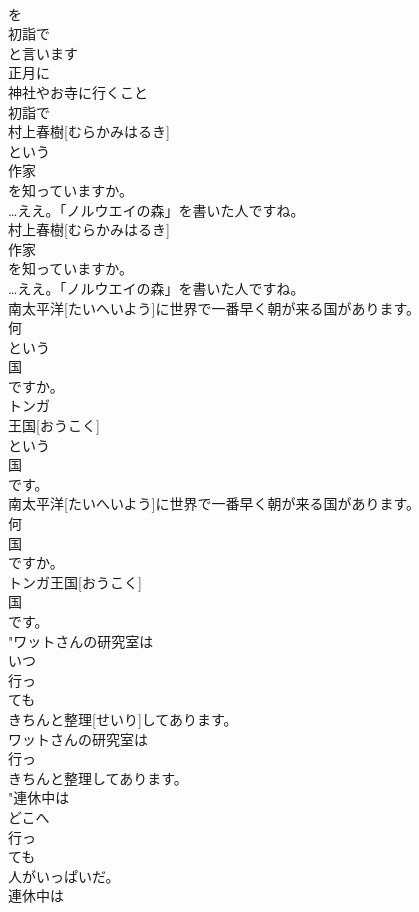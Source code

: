 \documentclass[8pt]{extreport}
\begin{document}
\begin{CJK}{UTF8}{min}
\\	を
\\	初詣で
\\	と言います
\\	正月に
\\	神社やお寺に行くこと
\\	初詣で
\\	村上春樹[むらかみはるき]
\\	という
\\	作家
\\	を知っていますか。
\\	…ええ。「ノルウエイの森」を書いた人ですね。
\\	村上春樹[むらかみはるき]
\\	作家
\\	を知っていますか。
\\	…ええ。「ノルウエイの森」を書いた人ですね。
\\	南太平洋[たいへいよう]に世界で一番早く朝が来る国があります。
\\	何
\\	という
\\	国
\\	ですか。
\\	トンガ
\\	王国[おうこく]
\\	という
\\	国
\\	です。
\\	南太平洋[たいへいよう]に世界で一番早く朝が来る国があります。
\\	何
\\	国
\\	ですか。
\\	トンガ王国[おうこく]
\\	国
\\	です。
\\	"ワットさんの研究室は
\\	いつ
\\	行っ
\\	ても
\\	きちんと整理[せいり]してあります。
\\	ワットさんの研究室は
\\	行っ
\\	きちんと整理してあります。
\\	"連休中は
\\	どこへ
\\	行っ
\\	ても
\\	人がいっぱいだ。
\\	連休中は

\end{CJK}
\end{document}
